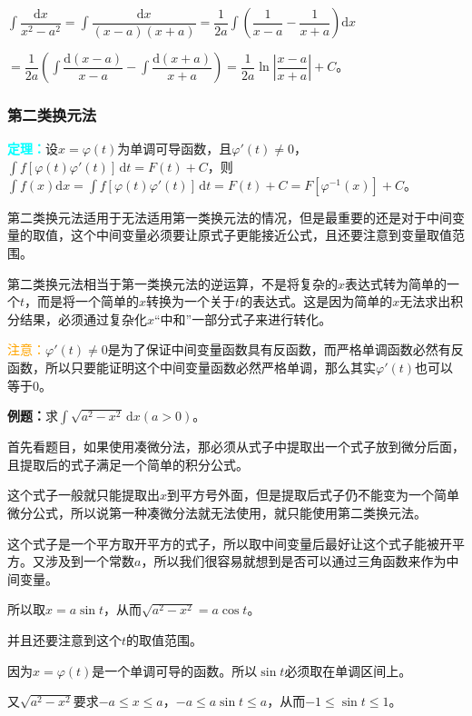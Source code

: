\documentclass[UTF8, 12pt]{ctexart}
\begin{document}
$\displaystyle{\int\dfrac{\textrm{d}x}{x^2-a^2}}=\displaystyle{\int\dfrac{\textrm{d}x}{(x-a)(x+a)}}=\dfrac{1}{2a}\displaystyle{\int\left(\dfrac{1}{x-a}-\dfrac{1}{x+a}\right)\textrm{d}x}$ \medskip

$=\dfrac{1}{2a}\left(\displaystyle{\int\dfrac{\textrm{d}(x-a)}{x-a}-\int\dfrac{\textrm{d}(x+a)}{x+a}}\right)=\dfrac{1}{2a}\ln\left\vert\dfrac{x-a}{x+a}\right\vert+C$。

\subsubsection{第二类换元法}

\textcolor{aqua}{\textbf{定理：}}设$x=\varphi(t)$为单调可导函数，且$\varphi'(t)\neq 0$，$\int f[\varphi(t)\varphi'(t)]\,\textrm{d}t=F(t)+C$，则$\int f(x)\textrm{d}x=\int f[\varphi(t)\varphi'(t)]\,\textrm{d}t=F(t)+C=F[\varphi^{-1}(x)]+C$。

第二类换元法适用于无法适用第一类换元法的情况，但是最重要的还是对于中间变量的取值，这个中间变量必须要让原式子更能接近公式，且还要注意到变量取值范围。

第二类换元法相当于第一类换元法的逆运算，不是将复杂的$x$表达式转为简单的一个$t$，而是将一个简单的$x$转换为一个关于$t$的表达式。这是因为简单的$x$无法求出积分结果，必须通过复杂化$x$“中和”一部分式子来进行转化。

\textcolor{orange}{注意：}$\varphi'(t)\neq 0$是为了保证中间变量函数具有反函数，而严格单调函数必然有反函数，所以只要能证明这个中间变量函数必然严格单调，那么其实$\varphi'(t)$也可以等于0。

\textbf{例题：}求$\int\sqrt{a^2-x^2}\,\textrm{d}x(a>0)$。

首先看题目，如果使用凑微分法，那必须从式子中提取出一个式子放到微分后面，且提取后的式子满足一个简单的积分公式。

这个式子一般就只能提取出$x$到平方号外面，但是提取后式子仍不能变为一个简单微分公式，所以说第一种凑微分法就无法使用，就只能使用第二类换元法。

这个式子是一个平方取开平方的式子，所以取中间变量后最好让这个式子能被开平方。又涉及到一个常数$a$，所以我们很容易就想到是否可以通过三角函数来作为中间变量。

所以取$x=a\sin t$，从而$\sqrt{a^2-x^2}=a\cos t$。

并且还要注意到这个$t$的取值范围。

因为$x=\varphi(t)$是一个单调可导的函数。所以$\sin t$必须取在单调区间上。

又$\sqrt{a^2-x^2}$要求$-a\leqslant x\leqslant a$，$-a\leqslant a\sin t\leqslant a$，从而$-1\leqslant\sin t\leqslant 1$。
\end{document}
